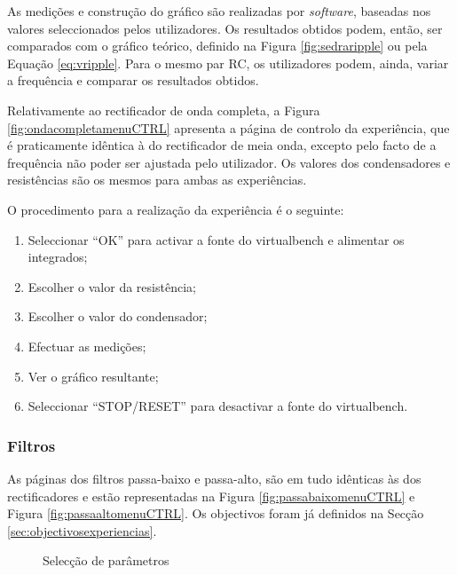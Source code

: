 As medições e construção do gráfico são realizadas por \textit{software}, baseadas nos valores seleccionados pelos utilizadores. Os resultados obtidos podem, então, ser comparados com o gráfico teórico, definido na Figura \ref{fig:sedraripple} ou pela Equação \ref{eq:vripple}. Para o mesmo par RC, os utilizadores podem, ainda, variar a frequência e comparar os resultados obtidos.

Relativamente ao rectificador de onda completa, a Figura \ref{fig:ondacompletamenuCTRL} apresenta a página de controlo da experiência, que é praticamente idêntica à do rectificador de meia onda, excepto pelo facto de a frequência não poder ser ajustada pelo utilizador. Os valores dos condensadores e resistências são os mesmos para ambas as experiências.

O procedimento para a realização da experiência é o seguinte:
\begin{enumerate}
	\item Seleccionar ``OK'' para activar a fonte do \acrshort{virtualbench} e alimentar os integrados;
	\item Escolher o valor da resistência;
	\item Escolher o valor do condensador;
	\item Efectuar as medições;
	\item Ver o gráfico resultante;
	\item Seleccionar ``STOP/RESET'' para desactivar a fonte do \acrshort{virtualbench}.
\end{enumerate}

\subsubsection{Filtros}
\label{sec:filtrosSW}
As páginas dos filtros passa-baixo e passa-alto, são em tudo idênticas às dos rectificadores e estão representadas na Figura \ref{fig:passabaixomenuCTRL} e Figura \ref{fig:passaaltomenuCTRL}. Os objectivos foram já definidos na Secção \ref{sec:objectivosexperiencias}.

\begin{figure}[hbtp]
	\centering%
		\centering
		\qquad
		\caption{Selecção de parâmetros}%
		\label{fig:controlofiltros}%
\end{figure}

